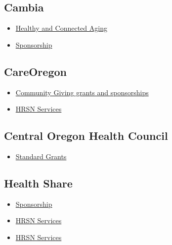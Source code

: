 \documentclass[
  letterpaper,
  DIV=11,
  numbers=noendperiod]{scrreprt}
\providecommand{\tightlist}{%
  \setlength{\itemsep}{0pt}\setlength{\parskip}{0pt}}\usepackage{longtable,booktabs,array}
\begin{document}
\subsection{Cambia}\label{cambia}

\begin{itemize}
\tightlist
\item
  \href{https://www.cambiahealthfoundation.org/focus-areas/healthy-and-connected-aging.html}{Healthy
  and Connected Aging}
\item
  \href{https://www.cambiahealthfoundation.org/applicant-resources/current-funding-opportunities.html}{Sponsorship}
\end{itemize}

\subsection{CareOregon}\label{careoregon}

\begin{itemize}
\tightlist
\item
  \href{https://www.careoregon.org/community/community-giving-grants-for-nonprofit-organizations}{Community
  Giving grants and sponsorships}
\item
  \href{request.social.determinants@careoregon.org,}{HRSN Services}
\end{itemize}

\subsection{Central Oregon Health
Council}\label{central-oregon-health-council}

\begin{itemize}
\tightlist
\item
  \href{https://cohealthcouncil.org/standard-grants/}{Standard Grants}
\end{itemize}

\subsection{Health Share}\label{health-share}

\begin{itemize}
\tightlist
\item
  \href{https://www.healthshareoregon.org/about/sponsorship}{Sponsorship}
\item
  \href{https://www.healthshareoregon.org/community-partners/hrsn}{HRSN
  Services}
\item
  \href{https://health-share-or.portals.zenginehq.com/program/community-capacity-building/info}{HRSN
  Services}
\end{itemize}
\end{document}
